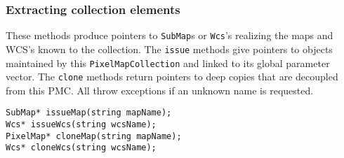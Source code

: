 \documentclass[11pt,preprint,flushrt]{aastex}
\begin{document}
\subsubsection{Extracting collection elements}
These methods produce pointers to {\tt SubMap}s or {\tt Wcs}'s realizing the maps and WCS's known to the collection.  The {\tt issue} methods give pointers to objects maintained by this {\tt PixelMapCollection} and linked to its global parameter vector.  The {\tt clone} methods return pointers to deep copies that are decoupled from this PMC.  All throw exceptions if an unknown name is requested.
\begin{verbatim}
SubMap* issueMap(string mapName);
Wcs* issueWcs(string wcsName);
PixelMap* cloneMap(string mapName);
Wcs* cloneWcs(string wcsName);
\end{verbatim}
\end{document}
